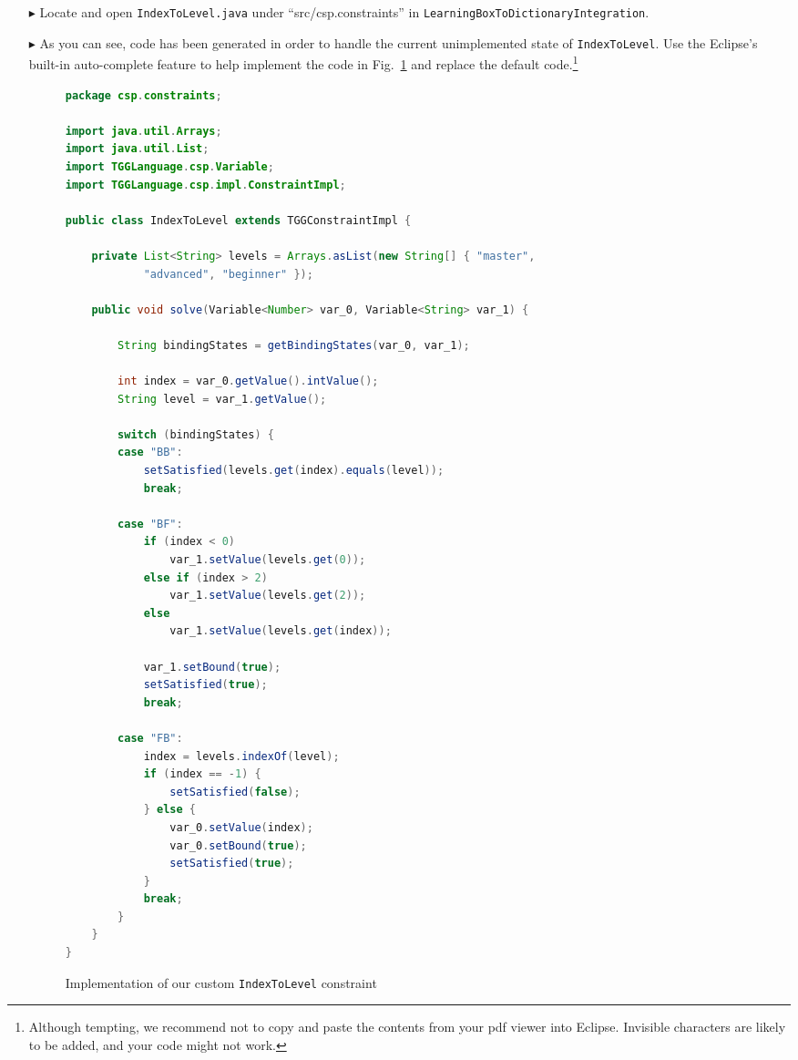 \begin{itemize}
\item[$\blacktriangleright$] Locate and open \texttt{IndexToLevel.java} under ``src/csp.constraints'' in \texttt{LearningBoxToDictionaryIntegration}.

\item[$\blacktriangleright$] As you can see, code has been generated in order to handle the current unimplemented state of \texttt{IndexToLevel}. Use the
Eclipse's built-in auto-complete feature to help implement the code in Fig.~\ref{code:indexToLevel} and replace the default code.\footnote{Although tempting, we
recommend not to copy and paste the contents from your pdf viewer into Eclipse. Invisible characters are likely to be added, and your code might not work.}

\begin{figure}[htbp]
\begin{center}
\begin{lstlisting}[language=Java,backgroundcolor=\color{white}, keywordstyle={\bfseries\color{purple}}]
package csp.constraints;

import java.util.Arrays;
import java.util.List;
import TGGLanguage.csp.Variable;
import TGGLanguage.csp.impl.ConstraintImpl;

public class IndexToLevel extends TGGConstraintImpl {

	private List<String> levels = Arrays.asList(new String[] { "master",
			"advanced", "beginner" });

	public void solve(Variable<Number> var_0, Variable<String> var_1) {

		String bindingStates = getBindingStates(var_0, var_1);
		
		int index = var_0.getValue().intValue();
		String level = var_1.getValue();

		switch (bindingStates) {
		case "BB":
			setSatisfied(levels.get(index).equals(level));
			break;

		case "BF":
			if (index < 0)
				var_1.setValue(levels.get(0));
			else if (index > 2)
				var_1.setValue(levels.get(2));
			else
				var_1.setValue(levels.get(index));

			var_1.setBound(true);
			setSatisfied(true);
			break;

		case "FB":
			index = levels.indexOf(level);
			if (index == -1) {
				setSatisfied(false);
			} else {
				var_0.setValue(index);
				var_0.setBound(true);
				setSatisfied(true);
			}
			break;
		}
	}
}
\end{lstlisting}
  \caption{Implementation of our custom \texttt{IndexToLevel} constraint}
  \label{code:indexToLevel}
\end{center}
\end{figure}

\end{itemize}

